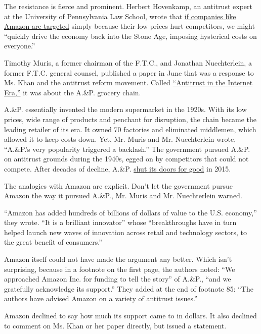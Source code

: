 The resistance is fierce and prominent. Herbert Hovenkamp, an antitrust
expert at the University of Pennsylvania Law School, wrote that
\href{https://scholarship.law.upenn.edu/faculty_scholarship/1769/}{if
companies like Amazon are targeted} simply because their low prices hurt
competitors, we might ``quickly drive the economy back into the Stone
Age, imposing hysterical costs on everyone.''

Timothy Muris, a former chairman of the F.T.C., and Jonathan
Nuechterlein, a former F.T.C. general counsel, published a paper in June
that was a response to Ms. Khan and the antitrust reform movement.
Called
\href{https://papers.ssrn.com/sol3/papers.cfm?abstract_id=3186569}{``Antitrust
in the Internet Era,''} it was about the A.\&P. grocery chain.

A.\&P. essentially invented the modern supermarket in the 1920s. With
its low prices, wide range of products and penchant for disruption, the
chain became the leading retailer of its era. It owned 70 factories and
eliminated middlemen, which allowed it to keep costs down. Yet, Mr.
Muris and Mr. Nuechterlein wrote, ``A.\&P.'s very popularity triggered a
backlash.'' The government pursued A.\&P. on antitrust grounds during
the 1940s, egged on by competitors that could not compete. After decades
of decline, A.\&P.
\href{https://www.nytimes3xbfgragh.onion/2015/07/21/business/ap-files-for-bankruptcy-and-aims-to-sell-120-stores.html}{shut
its doors for good} in 2015.

The analogies with Amazon are explicit. Don't let the government pursue
Amazon the way it pursued A.\&P., Mr. Muris and Mr. Nuechterlein warned.

``Amazon has added hundreds of billions of dollars of value to the U.S.
economy,'' they wrote. ``It is a brilliant innovator'' whose
``breakthroughs have in turn helped launch new waves of innovation
across retail and technology sectors, to the great benefit of
consumers.''

Amazon itself could not have made the argument any better. Which isn't
surprising, because in a footnote on the first page, the authors noted:
``We approached Amazon Inc. for funding to tell the story'' of A.\&P.,
``and we gratefully acknowledge its support.'' They added at the end of
footnote 85: ``The authors have advised Amazon on a variety of antitrust
issues.''

Amazon declined to say how much its support came to in dollars. It also
declined to comment on Ms. Khan or her paper directly, but issued a
statement.

